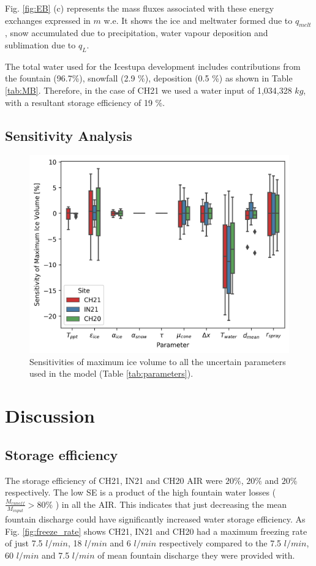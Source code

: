 \documentclass[utf8]{frontiersSCNS} %
\begin{document}
Fig. \ref{fig:EB} (c) represents the mass fluxes associated with these energy exchanges expressed in $m$ w.e. It shows
the ice and meltwater formed due to $q_{melt}$, snow accumulated due to precipitation, water vapour deposition and
sublimation due to $q_L$. 

The total water used for the Icestupa development includes contributions from the fountain (96.7\%), snowfall (2.9 \%),
deposition (0.5 \%) as shown in Table \ref{tab:MB}. Therefore, in the case of CH21 we used a water input of 1,034,328
$kg$, with a resultant storage efficiency of 19 \%.

\subsection{Sensitivity Analysis}
\begin{figure} 
    \begin{center} 
    \includegraphics[width=10 cm]{Figures/sensitivities.jpg} 
\end{center}
\caption{Sensitivities of maximum ice volume to all the uncertain parameters used in the model (Table
\ref{tab:parameters}). } 
\label{fig:sensitivity} 
\end{figure}

\section{Discussion} 
\subsection{Storage efficiency}
The storage efficiency of CH21, IN21 and CH20 AIR were $20\%$, $20\%$ and $20\%$ respectively. The low SE is a product
of the high  fountain water losses ( $\frac{M_{runoff}}{M_{input}}> 80 \%$ ) in all the AIR. This indicates that just
decreasing the mean fountain discharge could have significantly increased water storage efficiency. As Fig.
\ref{fig:freeze_rate} shows CH21, IN21 and CH20 had a maximum freezing rate of just 7.5 $l/min$, 18 $l/min$ and 6
$l/min$ respectively compared to the 7.5 $l/min$, 60 $l/min$ and 7.5 $l/min$ of mean fountain discharge they were
provided with.
\end{document}
